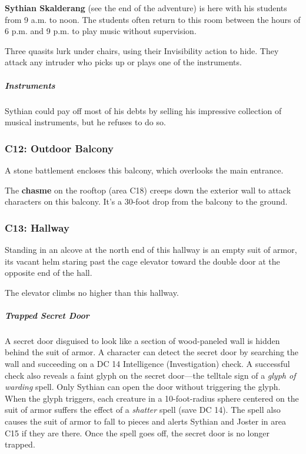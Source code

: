\documentclass[10pt,a4paper,twoside,bg=print,twocolumn,openany,nodeprecatedcode]{dndbook}
\begin{document}
\textbf{Sythian Skalderang} (see the end of the adventure) is here with his students from 9 a.m. to noon. The students often return to this room between the hours of 6 p.m. and 9 p.m. to play music without supervision.

Three quasits lurk under chairs, using their Invisibility action to hide. They attack any intruder who picks up or plays one of the instruments.

\subparagraph{Instruments}
Sythian could pay off most of his debts by selling his impressive collection of musical instruments, but he refuses to do so.

\subsubsection{C12: Outdoor Balcony}
\begin{DndReadAloud}{}
A stone battlement encloses this balcony, which overlooks the main entrance.

\end{DndReadAloud}

The \textbf{chasme} on the rooftop (area C18) creeps down the exterior wall to attack characters on this balcony. It's a 30-foot drop from the balcony to the ground.

\subsubsection{C13: Hallway}
\begin{DndReadAloud}{}
Standing in an alcove at the north end of this hallway is an empty suit of armor, its vacant helm staring past the cage elevator toward the double door at the opposite end of the hall.

\end{DndReadAloud}

The elevator climbs no higher than this hallway.

\subparagraph{Trapped Secret Door}
A secret door disguised to look like a section of wood-paneled wall is hidden behind the suit of armor. A character can detect the secret door by searching the wall and succeeding on a DC 14 Intelligence (Investigation) check. A successful check also reveals a faint glyph on the secret door—the telltale sign of a \textit{glyph of warding} spell. Only Sythian can open the door without triggering the glyph. When the glyph triggers, each creature in a 10-foot-radius sphere centered on the suit of armor suffers the effect of a \textit{shatter} spell (save DC 14). The spell also causes the suit of armor to fall to pieces and alerts Sythian and Joster in area C15 if they are there. Once the spell goes off, the secret door is no longer trapped.
\end{document}
